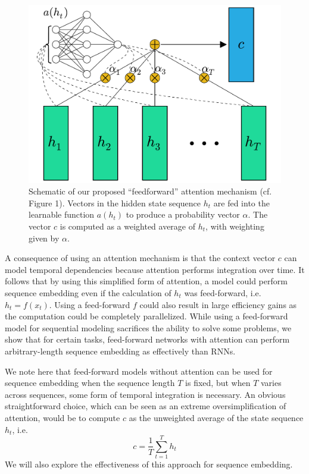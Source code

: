 \documentclass{article} %
\begin{document}
\begin{figure}
  \centering
  \includegraphics[width=.8\textwidth]{schematic.pdf}
  \caption{Schematic of our proposed ``feedforward'' attention mechanism (cf.\ \cite{cho2015introduction} Figure 1).  Vectors in the hidden state sequence $h_t$ are fed into the learnable function $a(h_t)$ to produce a probability vector $\alpha$.  The vector $c$ is computed as a weighted average of $h_t$, with weighting given by $\alpha$.}
  \label{fig:schematic}
\end{figure}


A consequence of using an attention mechanism is that the context vector $c$ can model temporal dependencies because attention performs integration over time.
It follows that by using this simplified form of attention, a model could perform sequence embedding even if the calculation of $h_t$ was feed-forward, i.e.\ $h_t = f(x_t)$.
Using a feed-forward $f$ could also result in large efficiency gains as the computation could be completely parallelized.
While using a feed-forward model for sequential modeling sacrifices the ability to solve some problems, we show that for certain tasks, feed-forward networks with attention can perform arbitrary-length sequence embedding as effectively than RNNs.

We note here that feed-forward models without attention can be used for sequence embedding when the sequence length $T$ is fixed, but when $T$ varies across sequences, some form of temporal integration is necessary.
An obvious straightforward choice, which can be seen as an extreme oversimplification of attention, would be to compute $c$ as the unweighted average of the state sequence $h_t$, i.e.
\begin{equation}
\label{eq:unweighted}
c = \frac{1}{T}\sum_{t = 1}^T h_t
\end{equation}
We will also explore the effectiveness of this approach for sequence embedding.
\end{document}
